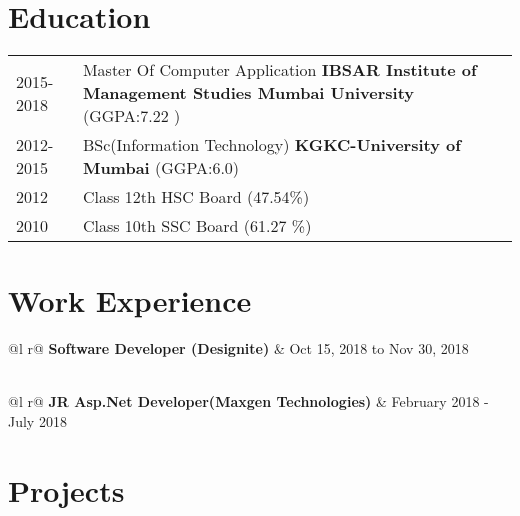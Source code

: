 \documentclass[a4paper,12pt]{article}
\begin{document}
\section{Education}
\begin{tabularx}{\linewidth}{@{}l X@{}}	
2015-2018 & Master Of Computer Application \textbf{IBSAR Institute of Management Studies Mumbai University} \hfill \normalsize (GGPA:7.22 ) \\

2012-2015 & BSc(Information Technology) \textbf{KGKC-University of  Mumbai} \hfill (GGPA:6.0) \\ 

2012 & Class 12th HSC Board \hfill  (47.54\%) \\

2010 & Class 10th SSC Board \hfill  (61.27 \%) \\
\end{tabularx}

\section{Work Experience}

\begin{tabularx}{\linewidth}{ @{}l r@{} }
\textbf{Software Developer (Designite)} & \hfill Oct 15, 2018 to Nov 30, 2018 \\[3.75pt]
  \\
\end{tabularx}

\begin{tabularx}{\linewidth}{ @{}l r@{} }
\textbf{JR Asp.Net Developer(Maxgen Technologies)} & \hfill February 2018 - July 2018 \\[3.75pt]
\end{tabularx}

\section{Projects}
\end{document}
